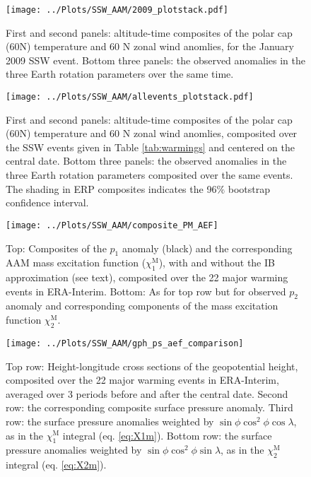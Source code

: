 \documentclass[draft,jgrga]{agutex}
\begin{document}
\begin{figure} 
\texttt{[image: ../Plots/SSW\_AAM/2009\_plotstack.pdf]} 
   \caption{First and second panels: altitude-time composites of the polar cap (60\degree N) temperature and 60 \degree N zonal wind anomlies, for the January 2009 SSW event.  Bottom three panels: the observed anomalies in the three Earth rotation parameters over the same time. }  
   \label{fig:2009event}
 \end{figure}


\begin{figure} 
\texttt{[image: ../Plots/SSW\_AAM/allevents\_plotstack.pdf]}
   \caption{First and second panels: altitude-time composites of the polar cap (60\degree N) temperature and 60 \degree N zonal wind anomlies, composited over the SSW events given in Table \ref{tab:warmings} and centered on the central date.  Bottom three panels: the observed anomalies in the three Earth rotation parameters composited over the same events.  The shading in ERP composites indicates the 96$\%$ bootstrap confidence interval.}
   \label{fig:summary}
 \end{figure}

\begin{figure}
  \noindent
  \texttt{[image: ../Plots/SSW\_AAM/composite\_PM\_AEF]} 
   \caption{Top: Composites of the $p_1$ anomaly (black) and the corresponding AAM mass excitation function  ($\chi_1^{\text{M}}$), with and without the IB approximation (see text), composited over  {the 22 major warming events in ERA-Interim}.   Bottom: As for top row but for observed $p_2$ anomaly and corresponding components of the mass excitation function $\chi_2^{\text{M}}$.}
   \label{fig:composites_X12}
 \end{figure}


\begin{figure}
  \noindent
  \texttt{[image: ../Plots/SSW\_AAM/gph\_ps\_aef\_comparison]}
   \caption{Top row: Height-longitude cross sections of the geopotential height, composited over  {the 22 major warming events in ERA-Interim},  averaged over 3 periods before and after the central date.  Second row: the corresponding composite surface pressure anomaly.  {Third} row: the surface pressure anomalies weighted by  $\sin \phi \cos^2 \phi \cos \lambda$, as in the $\chi_1^{\text{M}}$ integral  (eq. \ref{eq:X1m}).  Bottom row: the surface pressure anomalies weighted by  $\sin \phi \cos^2 \phi \sin \lambda$, as in the $\chi_2^{\text{M}}$ integral (eq. \ref{eq:X2m}).
}
   \label{fig:EGPH_mass_aam}
 \end{figure}
\end{document}
